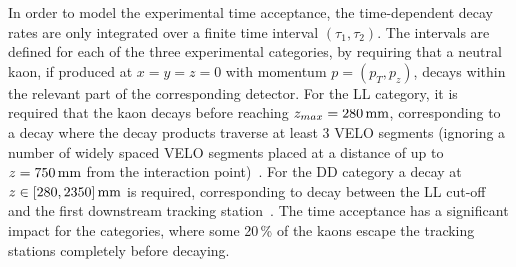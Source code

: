 In order to model the experimental time acceptance, the time-dependent decay rates are only integrated over a finite time interval $(\tau_1, \tau_2)$. The intervals are defined for each of the three experimental categories, by requiring that a neutral kaon, if produced at $x=y=z=0$ with momentum $p=(p_T, p_z)$, decays within the relevant part of the corresponding detector. For the LL \lhcb category, it is required that the kaon decays before reaching $z_{max}=280\text{\,mm}$, corresponding to a decay where the decay products traverse at least 3 VELO segments (ignoring a number of widely spaced VELO segments placed at a distance of up to $z=750\text{\,mm}$ from the interaction point)~\cite{CERN-LHCC-2003-030}. For the DD \lhcb category a decay at $z\in[280,2350]\text{\,mm}$ is required, corresponding to decay between the LL cut-off and the first downstream tracking station~\cite{LHCb-2003-140}. 
The time acceptance has a significant impact for the \lhcb categories, where some 20\,\% of the kaons escape the tracking stations completely before decaying.


